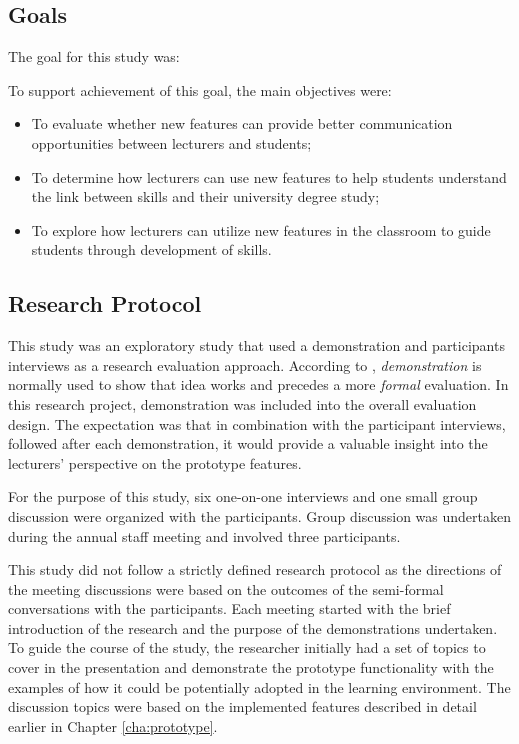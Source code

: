 \subsection{Goals}

The goal for this study was:


To support achievement of this goal, the main objectives were:

\begin{itemize}
  \item To evaluate whether new features can provide better communication
  opportunities between lecturers and students;
  \item To determine how lecturers can use new features to help students
  understand the link between \LLLs skills and their university degree study;
  \item To explore how lecturers can utilize new features in the classroom to
  guide students through development of \LLLs skills. 
\end{itemize}

\subsection{Research Protocol}

This study was an exploratory study that used a demonstration and participants
interviews as a research evaluation approach. According to \citet{Peffers2008},
\textit{demonstration} is normally used to show that idea works and precedes a
more \textit{formal} evaluation. In this research project, demonstration was
included into the overall evaluation design. The expectation was that in
combination with the participant interviews, followed after each demonstration,
it would provide a valuable insight into the lecturers' perspective on the
prototype features.

For the purpose of this study, six one-on-one interviews and one small group
discussion were organized with the participants. Group discussion was undertaken
during the annual staff meeting and involved three participants.

This study did not follow a strictly defined research protocol as the directions
of the meeting discussions were based on the outcomes of the semi-formal
conversations with the participants. Each meeting started with the brief
introduction of the research and the purpose of the demonstrations undertaken.
To guide the course of the study, the researcher initially had a set of topics
to cover in the presentation and demonstrate the prototype functionality with
the examples of how it could be potentially adopted in the learning environment.
The discussion topics were based on the implemented features described in detail
earlier in Chapter \ref{cha:prototype}.

